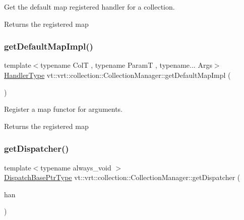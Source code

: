 Get the default map registered handler for a collection. 

\begin{DoxyReturn}{Returns}
the registered map 
\end{DoxyReturn}
\mbox{\label{structvt_1_1vrt_1_1collection_1_1_collection_manager_ae92ad81b99b380b0b87b85f7dbda767a}} 
\subsubsection{\texorpdfstring{get\+Default\+Map\+Impl()}{getDefaultMapImpl()}}
{\footnotesize\ttfamily template$<$typename ColT , typename ParamT , typename... Args$>$ \\
\hyperlink{namespacevt_af64846b57dfcaf104da3ef6967917573}{Handler\+Type} vt\+::vrt\+::collection\+::\+Collection\+Manager\+::get\+Default\+Map\+Impl (\begin{DoxyParamCaption}\item[{std\+::tuple$<$ Args... $>$}]{ }\end{DoxyParamCaption})\hspace{0.3cm}{\ttfamily [static]}}



Register a map functor for arguments. 

\begin{DoxyReturn}{Returns}
the registered map 
\end{DoxyReturn}
\mbox{\label{structvt_1_1vrt_1_1collection_1_1_collection_manager_af183a018e0d2d8b3ed024244d8f83f45}} 
\subsubsection{\texorpdfstring{get\+Dispatcher()}{getDispatcher()}}
{\footnotesize\ttfamily template$<$typename always\+\_\+void $>$ \\
\hyperlink{namespacevt_1_1vrt_1_1collection_aa3b9731ae16d60fac43d68840f3606a5}{Dispatch\+Base\+Ptr\+Type} vt\+::vrt\+::collection\+::\+Collection\+Manager\+::get\+Dispatcher (\begin{DoxyParamCaption}\item[{\hyperlink{structvt_1_1vrt_1_1collection_1_1_collection_manager_a0cfe02a0426e95ec9daa2ef7374e07c7}{Dispatch\+Handler\+Type} const \&}]{han }\end{DoxyParamCaption})}



